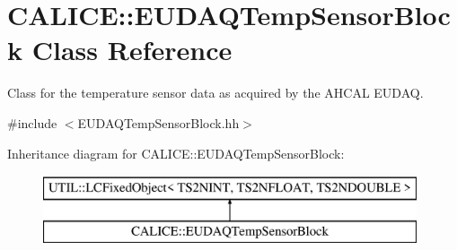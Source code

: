 \section{C\-A\-L\-I\-C\-E\-:\-:E\-U\-D\-A\-Q\-Temp\-Sensor\-Block Class Reference}
\label{classCALICE_1_1EUDAQTempSensorBlock}


Class for the temperature sensor data as acquired by the A\-H\-C\-A\-L E\-U\-D\-A\-Q.  




{\ttfamily \#include $<$E\-U\-D\-A\-Q\-Temp\-Sensor\-Block.\-hh$>$}

Inheritance diagram for C\-A\-L\-I\-C\-E\-:\-:E\-U\-D\-A\-Q\-Temp\-Sensor\-Block\-:\begin{figure}[H]
\begin{center}
\leavevmode
\includegraphics[height=2.000000cm]{classCALICE_1_1EUDAQTempSensorBlock}
\end{center}
\end{figure}
